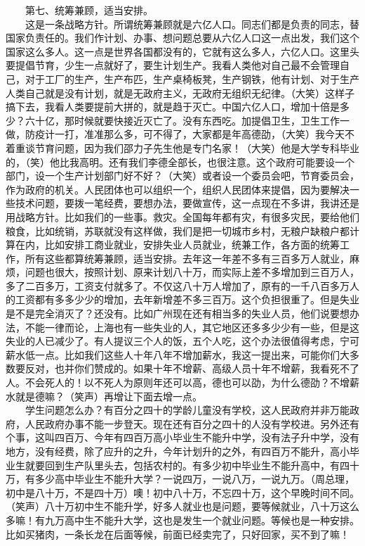 \documentclass[cn,11pt,chinese]{elegantbook}
\begin{document}
　　第七、统筹兼顾，适当安排。\\
　　这是一条战略方针。所谓统筹兼顾就是六亿人口。同志们都是负责的同志，替国家负责任的。我们作计划、办事、想问题总要从六亿人口这一点出发，我们这个国家这么多人。这一点是世界各国都没有的，它就有这么多人，六亿人口。这里头要提倡节育，少生一点就好了，要生计划生产。我看人类他对自己最不会管理自己，对于工厂的生产，生产布匹，生产桌椅板凳，生产钢铁，他有计划、对于生产人类自己就是没有计划，就是无政府主义，无政府无组织无纪律。（大笑）这样子搞下去，我看人类要提前大拼的，就是趋于灭亡。中国六亿人口，增加十倍是多少？六十亿，那时候就要快接近灭亡了。没有东西吃。加提倡卫生，卫生工作一做，防疫计一打，准准那么多，可不得了，大家都是年高德劭，（大笑）我今天不着重谈节育问题，因为我们邵力子先生他是专门名家！（大笑）他是大学专科毕业的，（笑）他比我高明。还有我们李德全部长，也很注意。这个政府可能要设一个部门，设一个生产计划部门好不好？（大笑）或者设一个委员会吧，节育委员会，作为政府的机关。人民团体也可以组织一个，组织人民团体来提倡，因为要解决一些技术问题，要拨一笔经费，要想办法，要做宣传，这一点现在不多讲，我讲还是用战略方针。比如我们的一些事。救灾。全国每年都有灾，有很多灾民，要给他们粮食，比如统销，苏联就没有这样做，我们是把一切城市乡村，无粮户缺粮户都计算在内，比如安排工商业就业，安排失业人员就业，统兼工作，各方面的统筹工作，所有这些都算统筹兼顾，适当安排。去年这一年差不多有三百多万人就业，麻烦，问题也很大，按照计划、原来计划八十万，而实际上差不多增加到三百万人，多了二百多万，工资支付就多了。不仅这八十万人增加了，原有的一千八百多万人的工资都有多多少少的增加，去年新增差不多三百万。这个负担很重了。但是失业是不是完全消灭了？还没有。比如广州现在还有相当多的失业人员，他们说要想办法，不能一律而论，上海也有一些失业的人，其它地区还多多少少有一些，但是这失业的人已减少了。有人提议三个人的饭，五个人吃，这个办法很值得考虑，宁可薪水低一点。比如我们这些人十年八年不增加薪水，我这一提出来，可能你们大多数要反对，也并你们赞成的。如果十年不增薪、高级人员十年不增薪，我看死不了人。不会死人的！以不死人为原则年还可以高，德也可以劭，为什么德劭？不增薪水就是德嘛？（笑声）再增让下面去增一点。\\
　　学生问题怎么办？有百分之四十的学龄儿童没有学校，这人民政府并非万能政府，人民政府办事不能一步登天。现在还有百分之四十的人没有学校进。另外还有个事，这叫四百万、今年有四百万高小毕业生不能升中学，没有法子升中学，没有地方，没有经费，除了应升的之升，今年计划升的之外，有四百万不能升，高小毕业生就要回到生产队里头去，包括农村的。有多少初中毕业生不能升高中，有四十万，有多少高中毕业生不能升大学？一说四万，一说八万，一说九万。（周总理，初中是八十万，不是四十万）噢！初中八十万，不忘四十万，这个早晚时间不同。（笑声）八十万初中生不能升学，好多人就业也是问题，要等候就业，八十万这么多嘛！有九万高中生不能升大学，这也是发生一个就业问题。等候也是一种安排。比如买猪肉，一条长龙在后面等候，前面已经卖完了，只好回家，买不到了嘛！\\
\end{document}
